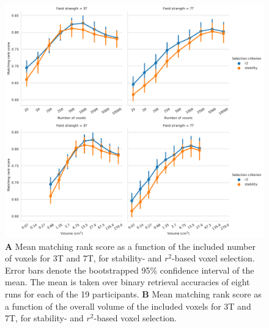 \begin{figure}[H]
  \centering
    \includegraphics[width=\linewidth]{pics/rank_selection.pdf}
	
  \caption{\textbf{A} Mean matching rank score as a function of the included number
  of voxels for 3T and 7T, for stability- and $r^2$-based voxel selection.
  Error bars denote the bootstrapped 95\% confidence interval of the mean. The
  mean is taken over binary retrieval accuracies of eight runs for each of the
  19 participants. \textbf{B} Mean matching rank score as a function of the overall
volume of the included voxels for 3T and 7T, for stability- and
$r^2$-based voxel selection.}

 \label{fig:matching_score_selection}
\end{figure}


